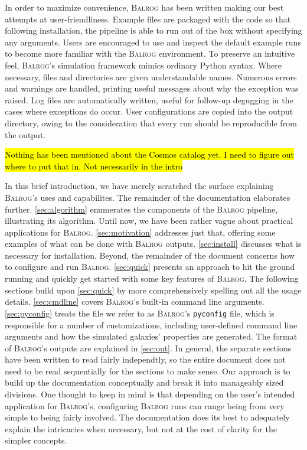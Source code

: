 \documentclass[12pt]{book}
\newcommand{\codett}[1]{\lstinline{#1}}
\newcommand{\py}{Python}
\newcommand{\pyconfig}{\codett{pyconfig}}
\newcommand{\balrog}{\textsc{Balrog}}
\begin{document}
In order to maximize convenience,
\balrog{} has been written making our best attempts at user-friendliness.
Example files are packaged with the code so that following installation,
the pipeline is able to run out of the box without specifying any arguments.
Users are encouraged to use and inspect the default example runs 
to become more familiar with the \balrog{} environment.
To preserve an intuitive feel, \balrog{}'s simulation framework mimics ordinary \py{} syntax. 
Where necessary, files and directories are given understandable names.
Numerous errors and warnings are handled, printing useful messages
about why the exception was raised.
Log files are automatically written, useful for follow-up degugging
in the cases where exceptions do occur. User configurations are copied into
the output directory, owing to the consideration that every run should be
reproducible from the output.

\hl{Nothing has been mentioned about the Cosmos catalog yet. I need to figure out where to put that in. Not necessarily in the intro}

In this brief introduction, we have merely scratched the surface explaining \balrog{}'s
uses and capabilites. The remainder of the documentation elaborates further.
\autoref{sec:algorithm} enumerates the components of the \balrog{} pipeline, illustrating its algorithm.
Until now, we have been rather vague about practical applications for \balrog{}.
\autoref{sec:motivation} addresses just that, offering some examples of what can be done with \balrog{} outputs.
\autoref{sec:install} discusses what is necessary for installation.
Beyond, the remainder of the document concerns how to configure and run \balrog{}.
\autoref{sec:quick} presents an approach to hit the ground running and quickly get
started with some key features of \balrog{}.
The following sections build upon \autoref{sec:quick} by more comprehensively spelling out all the usage details.
\autoref{sec:cmdline} covers \balrog{}'s built-in command line arguments.
\autoref{sec:pyconfig} treats the file we refer to as \balrog{}'s \pyconfig{} file, which is responsible for a number of customizations,
including user-defined command line arguments and how the simulated galaxies' properties are generated.
The format of \balrog{}'s outputs are explained in \autoref{sec:out}.
In general, the separate sections have been written to read fairly independtly,
so the entire document does not need to be read sequentially for the sections to make sense.
Our approach is to build up the documentation conceptually and break it into manageably sized divisions.
One thought to keep in mind is that depending on the user's intended application for \balrog{}'s,
configuring \balrog{} runs can range being from very simple to being fairly involved.
The documentation does its best to adequately explain the intricacies when necessary,
but not at the cost of clarity for the simpler concepts.
\end{document}
